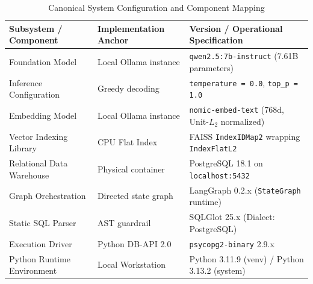 \begin{table}[h]
\centering
\caption{Canonical System Configuration and Component Mapping}
\label{tab:system_config}
\begin{tabular}{lll}
\hline
\textbf{Subsystem / Component} & \textbf{Implementation Anchor} & \textbf{Version / Operational Specification} \\
\hline
Foundation Model & Local Ollama instance & \texttt{qwen2.5:7b-instruct} (7.61B parameters) \\
Inference Configuration & Greedy decoding & \texttt{temperature = 0.0}, \texttt{top\_p = 1.0} \\
Embedding Model & Local Ollama instance & \texttt{nomic-embed-text} (768d, Unit-$L_2$ normalized) \\
Vector Indexing Library & CPU Flat Index & FAISS \texttt{IndexIDMap2} wrapping \texttt{IndexFlatL2} \\
Relational Data Warehouse & Physical container & PostgreSQL 18.1 on \texttt{localhost:5432} \\
Graph Orchestration & Directed state graph & LangGraph 0.2.x (\texttt{StateGraph} runtime) \\
Static SQL Parser & AST guardrail & SQLGlot 25.x (Dialect: PostgreSQL) \\
Execution Driver & Python DB-API 2.0 & \texttt{psycopg2-binary} 2.9.x \\
Python Runtime Environment & Local Workstation & Python 3.11.9 (venv) / Python 3.13.2 (system) \\
\hline
\end{tabular}
\end{table}
